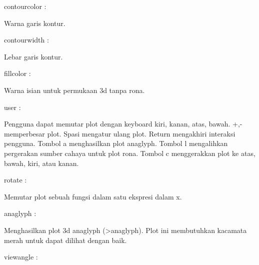 \documentclass[a4paper,10pt]{article}
\begin{document}
\begin{eulernotebook}
\begin{eulercomment}
\begin{eulercomment}
\begin{eulercomment}
\begin{eulercomment}
\begin{eulercomment}
\begin{eulercomment}
\begin{eulercomment}
\begin{eulercomment}
\begin{eulercomment}
contourcolor :\\
\end{eulercomment}
\begin{eulerttcomment}
  Warna garis kontur.
\end{eulerttcomment}
\begin{eulercomment}
contourwidth :\\
\end{eulercomment}
\begin{eulerttcomment}
  Lebar garis kontur.
\end{eulerttcomment}
\begin{eulercomment}
fillcolor :\\
\end{eulercomment}
\begin{eulerttcomment}
  Warna isian untuk permukaan 3d tanpa rona.
\end{eulerttcomment}
\begin{eulercomment}
user :\\
\end{eulercomment}
\begin{eulerttcomment}
  Pengguna dapat memutar plot dengan keyboard kiri, kanan, atas,
  bawah. +,- memperbesar plot. Spasi mengatur ulang plot. Return
  mengakhiri interaksi pengguna. Tombol a menghasilkan plot anaglyph.
  Tombol l mengalihkan pergerakan sumber cahaya untuk plot rona.
  Tombol c menggerakkan plot ke atas, bawah, kiri, atau kanan.
\end{eulerttcomment}
\begin{eulercomment}
rotate :\\
\end{eulercomment}
\begin{eulerttcomment}
  Memutar plot sebuah fungsi dalam satu ekspresi dalam x.
\end{eulerttcomment}
\begin{eulercomment}
anaglyph :\\
\end{eulercomment}
\begin{eulerttcomment}
  Menghasilkan plot 3d anaglyph (>anaglyph). Plot ini membutuhkan
  kacamata merah untuk dapat dilihat dengan baik.
\end{eulerttcomment}
\begin{eulercomment}
viewangle :\\
\end{eulercomment}
\begin{eulerttcomment}

\end{eulerttcomment}
\end{eulercomment}
\end{eulercomment}
\end{eulercomment}
\end{eulercomment}
\end{eulercomment}
\end{eulercomment}
\end{eulercomment}
\end{eulercomment}
\end{eulernotebook}
\end{document}
